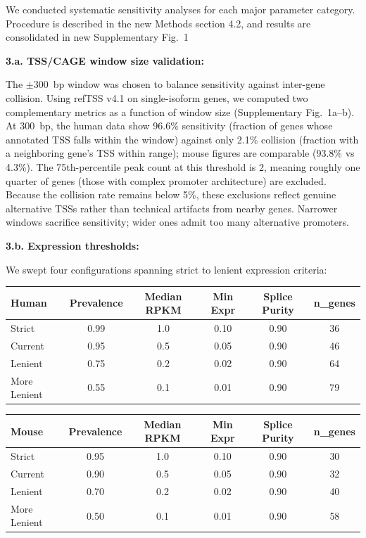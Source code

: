 \documentclass[11pt]{article}
\begin{document}
\begin{responseboxnew}
We conducted systematic sensitivity analyses for each major parameter category. Procedure is described in the new Methods section 4.2, and results are consolidated in new Supplementary Fig.~1

\vspace{0.3cm}
\textbf{3.a. TSS/CAGE window size validation:}

The $\pm$300~bp window was chosen to balance sensitivity against inter-gene collision. Using refTSS v4.1 on single-isoform genes, we computed two complementary metrics as a function of window size (Supplementary Fig.~1a--b). At 300~bp, the human data show 96.6\% sensitivity (fraction of genes whose annotated TSS falls within the window) against only 2.1\% collision (fraction with a neighboring gene's TSS within range); mouse figures are comparable (93.8\% vs 4.3\%). The 75th-percentile peak count at this threshold is 2, meaning roughly one quarter of genes (those with complex promoter architecture) are excluded. Because the collision rate remains below 5\%, these exclusions reflect genuine alternative TSSs rather than technical artifacts from nearby genes. Narrower windows sacrifice sensitivity; wider ones admit too many alternative promoters.

\vspace{0.3cm}
\textbf{3.b. Expression thresholds:}

We swept four configurations spanning strict to lenient expression criteria:

\vspace{0.2cm}
\begin{center}
\small
\begin{tabular}{lccccc}
\toprule
\textbf{Human} & Prevalence & Median RPKM & Min Expr & Splice Purity & n\_genes \\
\midrule
Strict       & 0.99 & 1.0 & 0.10 & 0.90 & 36 \\
Current      & 0.95 & 0.5 & 0.05 & 0.90 & 46 \\
Lenient      & 0.75 & 0.2 & 0.02 & 0.90 & 64 \\
More Lenient & 0.55 & 0.1 & 0.01 & 0.90 & 79 \\
\bottomrule
\end{tabular}

\vspace{0.3cm}

\begin{tabular}{lccccc}
\toprule
\textbf{Mouse} & Prevalence & Median RPKM & Min Expr & Splice Purity & n\_genes \\
\midrule
Strict       & 0.95 & 1.0 & 0.10 & 0.90 & 30 \\
Current      & 0.90 & 0.5 & 0.05 & 0.90 & 32 \\
Lenient      & 0.70 & 0.2 & 0.02 & 0.90 & 40 \\
More Lenient & 0.50 & 0.1 & 0.01 & 0.90 & 58 \\
\bottomrule
\end{tabular}
\end{center}


\end{responseboxnew}
\end{document}

